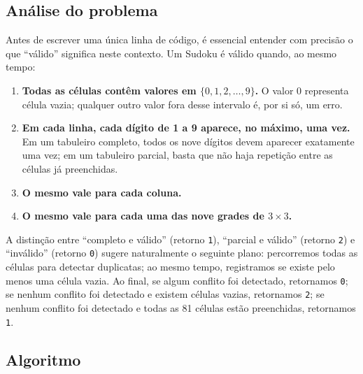 \documentclass[11pt,a4paper,oneside]{report}
\newcommand{\codigo}[1]{\texttt{\color{deitelblue}#1}}
\begin{document}
\subsection{Análise do problema}

Antes de escrever uma única linha de código, é essencial entender com
precisão o que ``válido'' significa neste contexto. Um Sudoku é válido
quando, ao mesmo tempo:

\begin{enumerate}
    \item \textbf{Todas as células contêm valores em $\{0, 1, 2, \ldots, 9\}$.}
        O valor $0$ representa célula vazia; qualquer outro valor fora desse
        intervalo é, por si só, um erro.
    \item \textbf{Em cada linha, cada dígito de 1 a 9 aparece, no máximo, uma vez.}
        Em um tabuleiro completo, todos os nove dígitos devem aparecer
        exatamente uma vez; em um tabuleiro parcial, basta que não haja
        repetição entre as células já preenchidas.
    \item \textbf{O mesmo vale para cada coluna.}
    \item \textbf{O mesmo vale para cada uma das nove grades de $3 \times 3$.}
\end{enumerate}

A distinção entre ``completo e válido'' (retorno \codigo{1}), ``parcial e
válido'' (retorno \codigo{2}) e ``inválido'' (retorno \codigo{0}) sugere
naturalmente o seguinte plano: percorremos todas as células para detectar
duplicatas; ao mesmo tempo, registramos se existe pelo menos uma célula
vazia. Ao final, se algum conflito foi detectado, retornamos \codigo{0};
se nenhum conflito foi detectado e existem células vazias, retornamos
\codigo{2}; se nenhum conflito foi detectado e todas as 81 células estão
preenchidas, retornamos \codigo{1}.

\subsection{Algoritmo}
\end{document}
